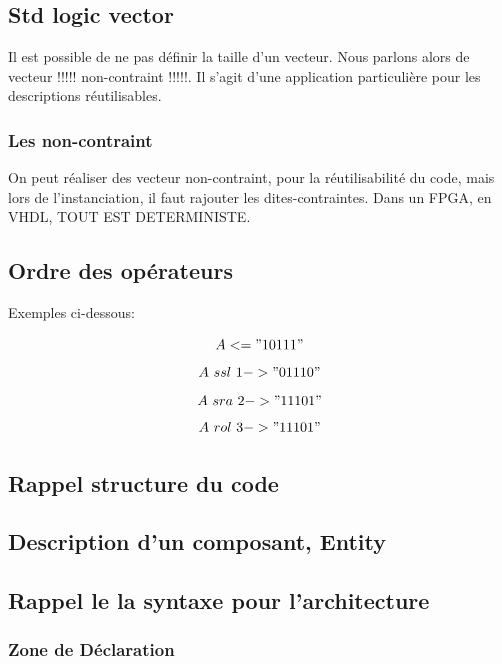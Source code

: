 \subsection{Std logic vector}


Il est possible de ne pas définir la taille d'un vecteur. Nous
parlons alors de vecteur !!!!! non-contraint !!!!!. Il s'agit d'une application
particulière pour les descriptions réutilisables.

\subsubsection{Les non-contraint}

On peut réaliser des vecteur non-contraint, pour la réutilisabilité du code, mais lors de l'instanciation, il faut rajouter les dites-contraintes. Dans un FPGA, en VHDL, TOUT EST DETERMINISTE.

\subsection{Ordre des opérateurs}
\newpage
Exemples ci-dessous:

$$ A <="10111"$$
$$ A ~ ssl ~  1 ->"01110"$$
$$ A  ~ sra ~  2 -> "11101"$$
$$ A  ~ rol ~  3 -> "11101"$$
 
 \subsection{Rappel structure du code}   
   
 \subsection{Description d'un composant, Entity}
\subsection{Rappel le la syntaxe pour l'architecture}


\subsubsection{Zone de Déclaration}

